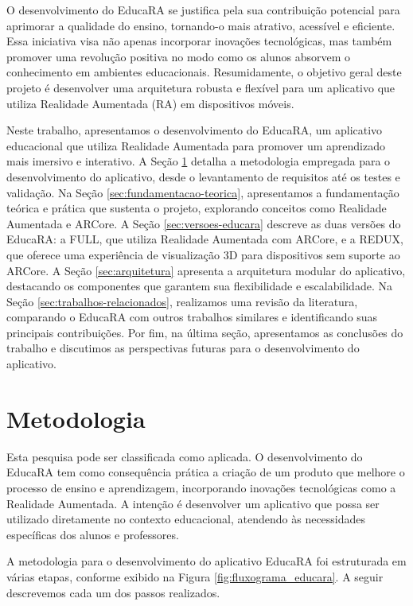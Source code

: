 \documentclass[12pt]{article}
\begin{document}
O desenvolvimento do EducaRA se justifica pela sua contribuição potencial para aprimorar a qualidade do ensino, tornando-o mais atrativo, acessível e eficiente. Essa iniciativa visa não apenas incorporar inovações tecnológicas, mas também promover uma revolução positiva no modo como os alunos absorvem o conhecimento em ambientes educacionais. Resumidamente, o objetivo geral deste projeto é desenvolver uma arquitetura robusta e flexível para um aplicativo que utiliza Realidade Aumentada (RA) em dispositivos móveis.

Neste trabalho, apresentamos o desenvolvimento do EducaRA, um aplicativo educacional que utiliza Realidade Aumentada para promover um aprendizado mais imersivo e interativo. A Seção \ref{sec:metodologia} detalha a metodologia empregada para o desenvolvimento do aplicativo, desde o levantamento de requisitos até os testes e validação. Na Seção \ref{sec:fundamentacao-teorica}, apresentamos a fundamentação teórica e prática que sustenta o projeto, explorando conceitos como Realidade Aumentada e ARCore. A Seção \ref{sec:versoes-educara} descreve as duas versões do EducaRA: a FULL, que utiliza Realidade Aumentada com ARCore, e a REDUX, que oferece uma experiência de visualização 3D para dispositivos sem suporte ao ARCore. A Seção \ref{sec:arquitetura} apresenta a arquitetura modular do aplicativo, destacando os componentes que garantem sua flexibilidade e escalabilidade. Na Seção \ref{sec:trabalhos-relacionados}, realizamos uma revisão da literatura, comparando o EducaRA com outros trabalhos similares e identificando suas principais contribuições. Por fim, na última seção, apresentamos as conclusões do trabalho e discutimos as perspectivas futuras para o desenvolvimento do aplicativo.

\section{Metodologia}\label{sec:metodologia}

Esta pesquisa pode ser classificada como aplicada. O desenvolvimento do EducaRA tem como consequência prática a criação de um produto que melhore o processo de ensino e aprendizagem, incorporando inovações tecnológicas como a Realidade Aumentada. A intenção é desenvolver um aplicativo que possa ser utilizado diretamente no contexto educacional, atendendo às necessidades específicas dos alunos e professores.

A metodologia para o desenvolvimento do aplicativo EducaRA foi estruturada em várias etapas, conforme exibido na Figura \ref{fig:fluxograma_educara}. A seguir descrevemos cada um dos passos realizados.
\end{document}
